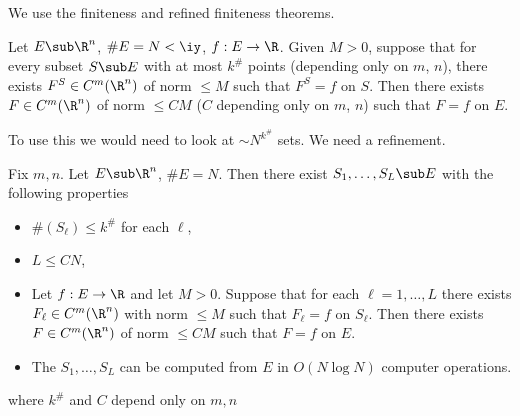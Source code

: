 We use the finiteness and refined finiteness theorems.
\begin{thm}\label{thm:fin}
Let $E\sub \R^n$, $\#E=N<\iy$, $f:E\to \R$. Given $M>0$, suppose that for every subset $S\sub E$ with at most $k^\#$ points (depending only on $m$, $n$), there exists $F^S\in C^m(\R^n)$ of norm $\le M$ such that $F^S=f$ on $S$. Then there exists $F\in C^m(\R^n)$ of norm $\le C M$ ($C$ depending only on $m$, $n$) such that $F=f$ on $E$.
\end{thm}
To use this we would need to look at $\sim N^{k^\#}$ sets.  %
We need a refinement. 

\begin{thm}\label{thm:rft}
Fix $m,n$. Let $E\sub \R^n$, $\#E = N$. Then there exist $S_1,\ldots ,S_L\sub E$ with the following properties
\begin{itemize}
\item
$\#(S_\ell)\le k^\#$ for each $\ell$,
\item
$L\le CN$,
\item
Let $f:E\to \R$ and let $M>0$. Suppose that for each $\ell=1,\ldots, L$ there exists $F_\ell\in C^m(\R^n)$ with norm $\le M$ such that $F_\ell=f$ on $S_\ell$. Then there exists $F\in C^m(\R^n)$ of norm $\le CM$ such that $F=f$ on $E$. 
\item
The $S_1,\ldots, S_L$ can be computed from $E$ in $O(N\log N)$ computer operations.
\end{itemize}
where $k^\#$ and $C$ depend only on $m,n$
\end{thm}

